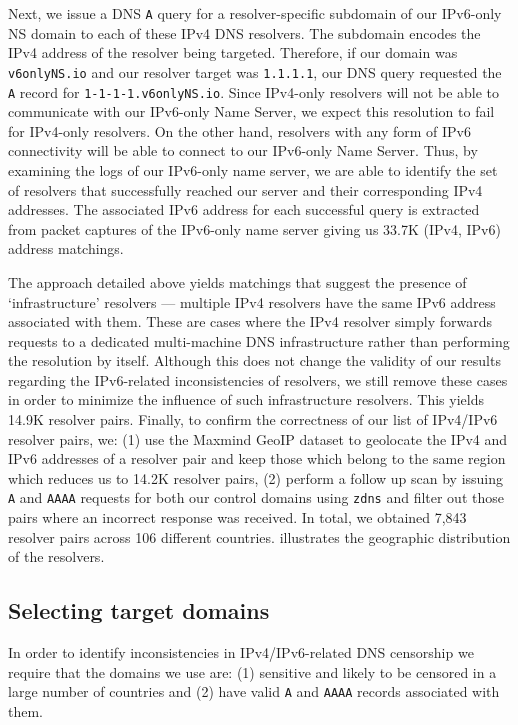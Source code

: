 Next, we issue a DNS {\tt A} query for a resolver-specific subdomain of our
IPv6-only NS domain to each of these IPv4 DNS resolvers. The subdomain encodes
the IPv4 address of the resolver being targeted. Therefore, if our domain was
{\tt v6onlyNS.io} and our resolver target was {\tt 1.1.1.1}, our DNS query
requested the {\tt A} record for {\tt 1-1-1-1.v6onlyNS.io}.
%
Since IPv4-only resolvers will not be able to communicate with our IPv6-only
Name Server, we expect this resolution to fail for IPv4-only resolvers.
On the other hand, resolvers with any form of IPv6 connectivity will be
able to connect to our IPv6-only Name Server.
%
Thus, by examining the logs of our IPv6-only name server, we are able
to identify the set of resolvers that successfully reached our server and
their corresponding IPv4 addresses. The associated IPv6 address for each
successful query is extracted from packet captures of the IPv6-only name
server giving us 33.7K (IPv4, IPv6) address matchings.

The approach detailed above yields matchings that suggest the presence of
`infrastructure' resolvers --- \eg multiple IPv4 resolvers have the same IPv6
address associated with them. These are cases where the IPv4 resolver simply
forwards requests to a dedicated multi-machine DNS infrastructure rather than
performing the resolution by itself. Although this does not change the validity
of our results regarding the IPv6-related inconsistencies of resolvers, we
still remove these cases in order to minimize the influence of such
infrastructure resolvers. This yields 14.9K resolver pairs.
%
Finally, to confirm the correctness of our list of IPv4/IPv6 resolver pairs, we:
(1) use the Maxmind GeoIP dataset \cite{maxmind-connectiondb} to geolocate the
IPv4 and IPv6 addresses of a resolver pair and keep those which belong to the
same region which reduces us to 14.2K resolver pairs, (2) perform a follow up
scan by issuing {\tt A} and {\tt AAAA} requests for both our control domains
using {\tt zdns} \cite{Durumeric13zmap} and filter out those pairs where an
incorrect response was received.
% 
In total, we obtained 7,843 resolver pairs across 106 different countries.
 illustrates the geographic distribution of the
resolvers.


\subsection{Selecting target domains}
\label{sec:methodology:domains}
In order to identify inconsistencies in IPv4/IPv6-related DNS censorship we
require that the domains we use are: (1) sensitive and likely to be censored in
a large number of countries and (2) have valid {\tt A} and {\tt AAAA} records
associated with them.

